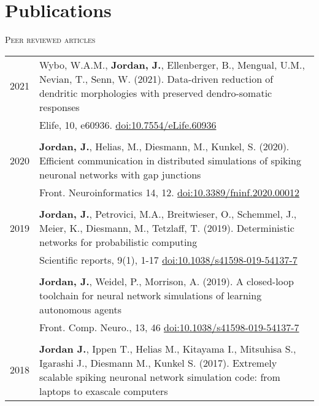 \section{Publications}
\textsc{Peer reviewed articles}
\begin{longtable}{>{\hfill}p{1.6cm} p{}}
  2021 & Wybo, W.A.M., \textbf{Jordan, J.}, Ellenberger, B., Mengual, U.M., Nevian, T., Senn, W. (2021). Data-driven reduction of dendritic morphologies with preserved dendro-somatic responses \\
  & \footnotesize Elife, 10, e60936. \href{https://doi.org/10.7554/eLife.60936}{doi:10.7554/eLife.60936} \\
    \multicolumn{2}{c}{} \\
  2020 & \textbf{Jordan, J.}, Helias, M., Diesmann, M., Kunkel, S. (2020). Efficient communication in distributed simulations of spiking neuronal networks with gap junctions \\
       & \footnotesize Front. Neuroinformatics 14, 12. \href{https://doi.org/10.3389/fninf.2020.00012}{doi:10.3389/fninf.2020.00012} \\
  \multicolumn{2}{c}{} \\
  2019 & \textbf{Jordan, J.}, Petrovici, M.A., Breitwieser, O., Schemmel, J., Meier, K., Diesmann, M., Tetzlaff, T. (2019). Deterministic networks for probabilistic computing \\
       & \footnotesize Scientific reports, 9(1), 1-17 \href{https://doi.org/10.1038/s41598-019-54137-7}{doi:10.1038/s41598-019-54137-7} \\
  \multicolumn{2}{c}{} \\
       & \textbf{Jordan, J.}, Weidel, P., Morrison, A. (2019). A closed-loop toolchain for neural network simulations of learning autonomous agents \\
       & \footnotesize Front. Comp. Neuro., 13, 46 \href{https://doi.org/10.3389/fncom.2019.00046}{doi:10.1038/s41598-019-54137-7} \\
  \multicolumn{2}{c}{} \\
  2018 & \textbf{Jordan J.}, Ippen T., Helias M., Kitayama I., Mitsuhisa S., Igarashi J., Diesmann M., Kunkel S. (2017). Extremely scalable spiking neuronal network simulation code: from laptops to exascale computers \\

\end{longtable}

